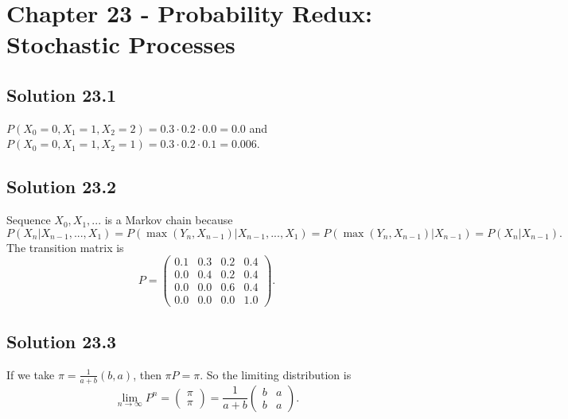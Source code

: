\section*{Chapter 23 - Probability Redux: Stochastic Processes}

\subsection*{Solution 23.1}

$P(X_0 = 0, X_1 = 1, X_2 = 2) = 0.3 \cdot 0.2 \cdot 0.0 = 0.0$ and $P(X_0 = 0, X_1 = 1, X_2 = 1) = 0.3 \cdot 0.2 \cdot 0.1 = 0.006$.


\subsection*{Solution 23.2}

Sequence $X_0, X_1, ...$ is a Markov chain because
\begin{equation*}
    P(X_n | X_{n - 1}, ..., X_1) = P(\max(Y_n, X_{n - 1}) | X_{n - 1}, ..., X_1)
        = P(\max(Y_n, X_{n - 1}) | X_{n - 1})
        = P(X_n | X_{n - 1}).
\end{equation*}
The transition matrix is
\begin{equation*}
    P = \begin{pmatrix}
        0.1 & 0.3 & 0.2 & 0.4 \\
        0.0 & 0.4 & 0.2 & 0.4 \\
        0.0 & 0.0 & 0.6 & 0.4 \\
        0.0 & 0.0 & 0.0 & 1.0
    \end{pmatrix}.
\end{equation*}


\subsection*{Solution 23.3}

If we take $\pi = \frac{1}{a + b}(b, a)$, then $\pi P = \pi$.
So the limiting distribution is
\begin{equation*}
    \lim_{n \to \infty} P^n = \begin{pmatrix} \pi \\ \pi \end{pmatrix}
        = \frac{1}{a + b} \begin{pmatrix}
            b & a \\
            b & a
        \end{pmatrix}.
\end{equation*}
